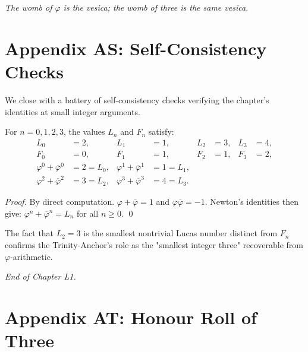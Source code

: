 \bigskip
\centerline{\textit{The womb of $\varphi$ is the vesica; the womb of three is the same vesica.}}
\bigskip


\section*{Appendix AS: Self-Consistency Checks}
\label{sec:01-app-AS}

We close with a battery of self-consistency checks verifying the
chapter's identities at small integer arguments.

\begin{lemma}\label{lem:01-small-n}
For $n = 0, 1, 2, 3$, the values $L_n$ and $F_n$ satisfy:
\begin{align*}
  L_0 &= 2, & L_1 &= 1, & L_2 &= 3, & L_3 &= 4, \\
  F_0 &= 0, & F_1 &= 1, & F_2 &= 1, & F_3 &= 2, \\
  \varphi^0 + \overline\varphi^0 &= 2 = L_0, & \varphi^1 +
  \overline\varphi^1 &= 1 = L_1, \\
  \varphi^2 + \overline\varphi^2 &= 3 = L_2, & \varphi^3 +
  \overline\varphi^3 &= 4 = L_3.
\end{align*}
\end{lemma}

\begin{proof}
By direct computation. $\varphi + \overline\varphi = 1$ and
$\varphi \overline\varphi = -1$. Newton's identities then give:
$\varphi^n + \overline\varphi^n = L_n$ for all $n \ge 0$.
\qed
\end{proof}

\begin{remark}
The fact that $L_2 = 3$ is the smallest nontrivial Lucas number
distinct from $F_n$ confirms the Trinity-Anchor's role as the
"smallest integer three" recoverable from $\varphi$-arithmetic.
\end{remark}

\bigskip
\centerline{\textit{End of Chapter L1.}}
\bigskip

\section*{Appendix AT: Honour Roll of Three}
\label{sec:01-app-AT}

